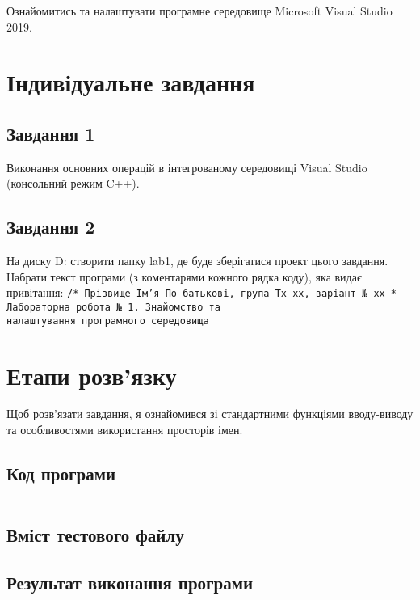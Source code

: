 \documentclass[a4paper, 12pt, oneside]{extarticle}
\begin{document}
\Margins



Ознайомитись та налаштувати програмне середовище Microsoft Visual
Studio 2019.

\section*{Індивідуальне завдання}

\subsection*{Завдання 1}

Виконання основних операцій в інтегрованому середовищі Visual Studio
(консольний режим C++).

\subsection*{Завдання 2}

На диску D: створити папку lab1, де буде зберігатися проект цього завдання.
Набрати текст програми (з коментарями кожного рядка коду), яка видає
привітання:
\texttt{/* Прізвище Ім’я По батькові, група Тх-хх, варіант № хх * Лабораторна
робота № 1. Знайомство та \\налаштування програмного середовища}

\section*{Етапи розв'язку}

Щоб розв'язати завдання, я ознайомився зі стандартними функціями вводу-виводу та
особливостями використання просторів імен.

\subsection*{Код програми}

\inputminted{c++}{1.cpp}

\subsection*{Вміст тестового файлу}


\subsection*{Результат виконання програми}
\end{document}
